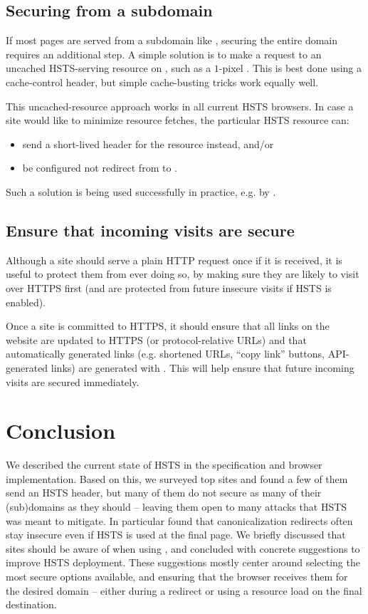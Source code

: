 \documentclass{acm_proc_article-sp}
\begin{document}
\subsection{Securing {\s} from a subdomain}

If most pages are served from a subdomain like {\sw}, securing the entire domain requires an additional step. A simple solution is to make a request to an uncached HSTS-serving resource on {\s}, such as a $1$-pixel . This is best done using a cache-control header, but simple cache-busting tricks work equally well.

This uncached-resource approach works in all current HSTS browsers. In case a site would like to minimize resource fetches, the particular HSTS resource can:
\begin{itemize}
\item send a short-lived  header for the resource instead, and/or
\item be configured not redirect from {\s} to {\sw}.
\end{itemize}

Such a solution is being used successfully in practice, e.g. by .

\subsection{Ensure that incoming visits are secure}

Although a site should serve a plain HTTP request once if it is received, it is useful to protect them from ever doing so, by making sure they are likely to visit over HTTPS first (and are protected from future insecure visits if HSTS is enabled).

Once a site is committed to HTTPS, it should ensure that all links on the website are updated to HTTPS (or protocol-relative URLs) and that automatically generated links (e.g. shortened URLs, ``copy link'' buttons, API-generated links) are generated with . This will help ensure that future incoming visits are secured immediately.


\section{Conclusion}

We described the current state of HSTS in the specification and browser implementation. Based on this, we surveyed top sites and found a few of them send an HSTS header, but many of them do not secure as many of their (sub)domains as they should -- leaving them open to many attacks that HSTS was meant to mitigate. In particular found that canonicalization redirects often stay insecure even if HSTS is used at the final page. We briefly discussed that sites should be aware of when using {\iSD}, and concluded with concrete suggestions to improve HSTS deployment. These suggestions mostly center around selecting the most secure options available, and ensuring that the browser receives them for the desired domain -- either during a redirect or using a resource load on the final destination.
\end{document}
